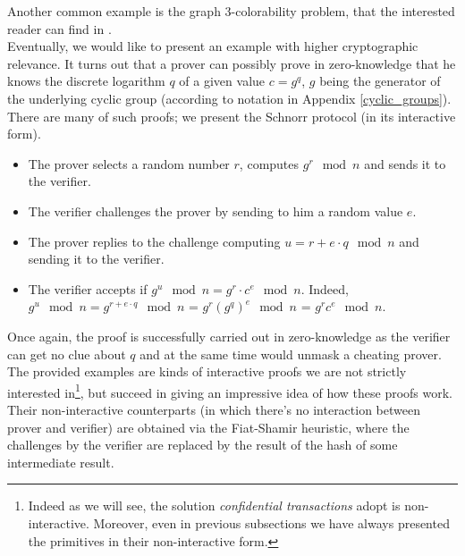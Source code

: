 Another common example is the graph 3-colorability problem, that the interested reader can find in \cite{PedroFranco}.\\
Eventually, we would like to present an example with higher cryptographic relevance. It turns out that a prover can possibly prove in zero-knowledge that he knows the discrete logarithm $q$ of a given value $c = g^q$, $g$ being the generator of the underlying cyclic group (according to notation in Appendix \ref{cyclic_groups}). There are many of such proofs; we present the Schnorr protocol (in its interactive form).
\begin{itemize}
    \item The prover selects a random number $r$, computes $g^r \mod{n}$ and sends it to the verifier.
    \item The verifier challenges the prover by sending to him a random value $e$. 
    \item The prover replies to the challenge computing $u = r + e\cdot q \mod{n} $ and sending it to the verifier.
    \item The verifier accepts if $g^u \mod{n} = g^r\cdot c^e \mod{n}$. Indeed, $g^u \mod{n} = g^{r + e\cdot q} \mod{n}$ = $g^r {(g^q)}^e \mod{n}$ = $g^r c^e \mod{n}$.
\end{itemize}
Once again, the proof is successfully carried out in zero-knowledge as the verifier can get no clue about $q$ and at the same time would unmask a cheating prover.\\ 
The provided examples are kinds of interactive proofs we are not strictly interested in\footnote{Indeed as we will see, the solution \textit{confidential transactions} adopt is non-interactive. Moreover, even in previous subsections we have always presented the primitives in their non-interactive form.}, but succeed in giving an impressive idea of how these proofs work. Their non-interactive counterparts (in which there's no interaction between prover and verifier) are obtained via the Fiat-Shamir heuristic, where the challenges by the verifier are replaced by the result of the hash of some intermediate result. 

